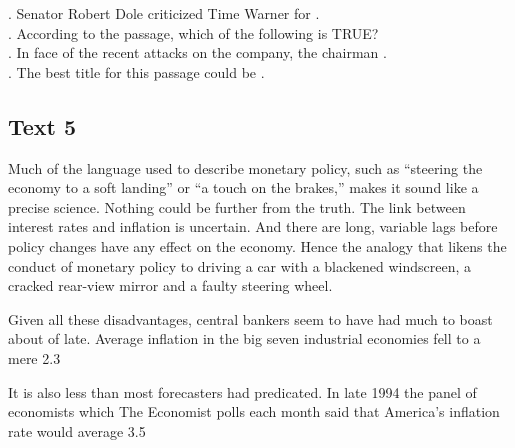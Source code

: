 \begin{questions}  .	Senator Robert Dole criticized Time Warner for \ltk{}.\\
.	According to the passage, which of the following is TRUE?\\
.	In face of the recent attacks on the company, the chairman \ltk{}.\\
.	The best title for this passage could be \ltk{}.\\
\end{questions}

\subsection{Text 5}
Much of the language used to describe monetary policy, such as “steering the economy to a soft landing” or “a touch on the brakes,” makes it sound like a precise science. Nothing could be further from the truth. The link between interest rates and inflation is uncertain. And there are long, variable lags before policy changes have any effect on the economy. Hence the analogy that likens the conduct of monetary policy to driving a car with a blackened windscreen, a cracked rear-view mirror and a faulty steering wheel.

Given all these disadvantages, central bankers seem to have had much to boast about of late. Average inflation in the big seven industrial economies fell to a mere 2.3%

It is also less than most forecasters had predicated. In late 1994 the panel of economists which The Economist polls each month said that America’s inflation rate would average 3.5%

